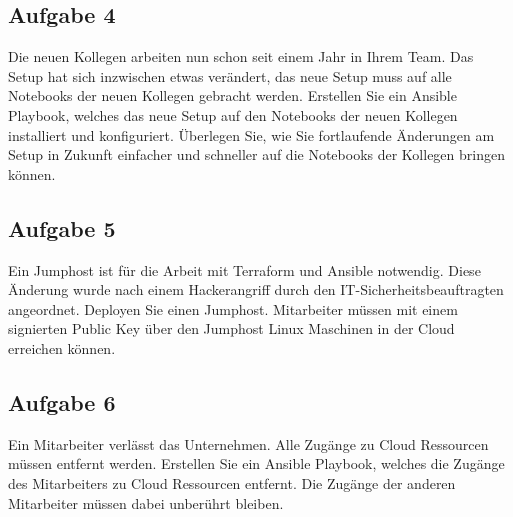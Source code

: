 \documentclass{article}
\begin{document}
    \subsection{Aufgabe 4}
    Die neuen Kollegen arbeiten nun schon seit einem Jahr in Ihrem Team.
    Das Setup hat sich inzwischen etwas verändert, das neue Setup muss auf alle Notebooks der neuen Kollegen gebracht werden.
    Erstellen Sie ein Ansible Playbook, welches das neue Setup auf den Notebooks der neuen Kollegen installiert und konfiguriert.
    Überlegen Sie, wie Sie fortlaufende Änderungen am Setup in Zukunft einfacher und schneller auf die Notebooks der Kollegen bringen können.

    \subsection{Aufgabe 5}
    Ein Jumphost ist für die Arbeit mit Terraform und Ansible notwendig.
    Diese Änderung wurde nach einem Hackerangriff durch den IT-Sicherheitsbeauftragten angeordnet.
    Deployen Sie einen Jumphost. Mitarbeiter müssen mit einem signierten Public Key über den Jumphost Linux Maschinen in der Cloud erreichen können.

    \subsection{Aufgabe 6}
    Ein Mitarbeiter verlässt das Unternehmen. Alle Zugänge zu Cloud Ressourcen müssen entfernt werden.
    Erstellen Sie ein Ansible Playbook, welches die Zugänge des Mitarbeiters zu Cloud Ressourcen entfernt.
    Die Zugänge der anderen Mitarbeiter müssen dabei unberührt bleiben.
\end{document}
